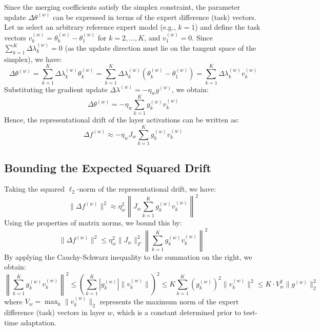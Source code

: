 \documentclass{article}
\theoremstyle{plain}
\theoremstyle{definition}
\theoremstyle{remark}
\begin{document}
Since the merging coefficients satisfy the simplex constraint, the parameter update $\Delta \theta^{(w)}$ can be expressed in terms of the expert difference (task) vectors. Let us select an arbitrary reference expert model (e.g., $k=1$) and define the task vectors $v_k^{(w)} = \theta_k^{(w)} - \theta_1^{(w)}$ for $k=2, \dots, K$, and $v_1^{(w)} = 0$. Since $\sum_{k=1}^K \Delta \lambda_k^{(w)} = 0$ (as the update direction must lie on the tangent space of the simplex), we have:
\begin{equation}
  \Delta \theta^{(w)} = \sum_{k=1}^K \Delta \lambda_k^{(w)} \theta_k^{(w)} = \sum_{k=1}^K \Delta \lambda_k^{(w)} (\theta_k^{(w)} - \theta_1^{(w)}) = \sum_{k=1}^K \Delta \lambda_k^{(w)} v_k^{(w)}
\end{equation}
Substituting the gradient update $\Delta \lambda^{(w)} = -\eta_w g^{(w)}$, we obtain:
\begin{equation}
  \Delta \theta^{(w)} = -\eta_w \sum_{k=1}^K g_k^{(w)} v_k^{(w)}
\end{equation}
Hence, the representational drift of the layer activations can be written as:
\begin{equation}
  \Delta f^{(w)} \approx -\eta_w J_w \sum_{k=1}^K g_k^{(w)} v_k^{(w)}
\end{equation}

\subsection{Bounding the Expected Squared Drift}
Taking the squared $\ell_2$-norm of the representational drift, we have:
\begin{equation}
  \|\Delta f^{(w)}\|^2 \approx \eta_w^2 \left\| J_w \sum_{k=1}^K g_k^{(w)} v_k^{(w)} \right\|^2
\end{equation}
Using the properties of matrix norms, we bound this by:
\begin{equation}
  \|\Delta f^{(w)}\|^2 \leq \eta_w^2 \|J_w\|_F^2 \left\| \sum_{k=1}^K g_k^{(w)} v_k^{(w)} \right\|^2
\end{equation}
By applying the Cauchy-Schwarz inequality to the summation on the right, we obtain:
\begin{equation}
  \left\| \sum_{k=1}^K g_k^{(w)} v_k^{(w)} \right\|^2 \leq \left( \sum_{k=1}^K |g_k^{(w)}| \|v_k^{(w)}\| \right)^2 \leq K \sum_{k=1}^K (g_k^{(w)})^2 \|v_k^{(w)}\|^2 \leq K \cdot V_w^2 \|g^{(w)}\|_2^2
\end{equation}
where $V_w = \max_k \|v_k^{(w)}\|_2$ represents the maximum norm of the expert difference (task) vectors in layer $w$, which is a constant determined prior to test-time adaptation.
\end{document}
